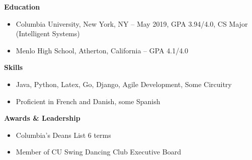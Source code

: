 \documentclass{article}
\begin{document}
\noindent
{\large\textbf{Education}}
\begin{itemize}[noitemsep]
    \item Columbia University, New York, NY -- May 2019, GPA 3.94/4.0, CS Major (Intelligent Systems)
    \item Menlo High School, Atherton, California -- GPA 4.1/4.0
\end{itemize}

\noindent
{\large\textbf{Skills}}
\begin{itemize}[noitemsep]
    \item Java, Python, Latex, Go, Django, Agile Development, Some Circuitry
    \item Proficient in French and Danish, some Spanish
\end{itemize}
\noindent
{\large\textbf{Awards \& Leadership}}
\begin{itemize}[noitemsep]
    \item Columbia's Deans List 6 terms
    \item Member of CU Swing Dancing Club Executive Board

\end{itemize}
\end{document}
